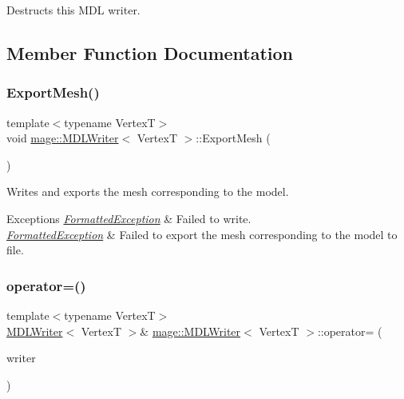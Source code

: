Destructs this M\+DL writer. 

\subsection{Member Function Documentation}
\hypertarget{classmage_1_1_m_d_l_writer_af3f41c26153fe3d22b6a4d62140ca113}{}\label{classmage_1_1_m_d_l_writer_af3f41c26153fe3d22b6a4d62140ca113} 
\subsubsection{\texorpdfstring{Export\+Mesh()}{ExportMesh()}}
{\footnotesize\ttfamily template$<$typename VertexT$>$ \\
void \hyperlink{classmage_1_1_m_d_l_writer}{mage\+::\+M\+D\+L\+Writer}$<$ VertexT $>$\+::Export\+Mesh (\begin{DoxyParamCaption}{ }\end{DoxyParamCaption})\hspace{0.3cm}{\ttfamily [private]}}

Writes and exports the mesh corresponding to the model.


\begin{DoxyExceptions}{Exceptions}
{\em \hyperlink{structmage_1_1_formatted_exception}{Formatted\+Exception}} & Failed to write. \\
\hline
{\em \hyperlink{structmage_1_1_formatted_exception}{Formatted\+Exception}} & Failed to export the mesh corresponding to the model to file. \\
\hline
\end{DoxyExceptions}
\hypertarget{classmage_1_1_m_d_l_writer_a9ea7ddf81f38da846a749a82928e91e9}{}\label{classmage_1_1_m_d_l_writer_a9ea7ddf81f38da846a749a82928e91e9} 
\subsubsection{\texorpdfstring{operator=()}{operator=()}\hspace{0.1cm}{\footnotesize\ttfamily [1/2]}}
{\footnotesize\ttfamily template$<$typename VertexT$>$ \\
\hyperlink{classmage_1_1_m_d_l_writer}{M\+D\+L\+Writer}$<$ VertexT $>$\& \hyperlink{classmage_1_1_m_d_l_writer}{mage\+::\+M\+D\+L\+Writer}$<$ VertexT $>$\+::operator= (\begin{DoxyParamCaption}\item[{const \hyperlink{classmage_1_1_m_d_l_writer}{M\+D\+L\+Writer}$<$ VertexT $>$ \&}]{writer }\end{DoxyParamCaption})\hspace{0.3cm}{\ttfamily [delete]}}

